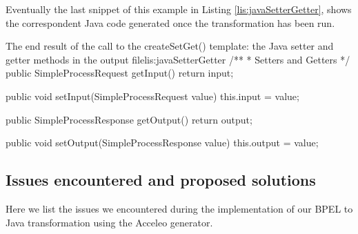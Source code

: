Eventually the last snippet of this example in Listing \ref{lis:javaSetterGetter}, shows the correspondent Java code generated once the transformation has been run.

\begin{center}
  \begin{minipage}{1\textwidth}
    \begin{java-code}{The end result of the call to the createSetGet() template: the Java setter and getter methods in the output file}{lis:javaSetterGetter}
    /**
     * Setters and Getters    
     */
public SimpleProcessRequest getInput() {
	return input;
}

public void setInput(SimpleProcessRequest value) { 
	this.input = value;
}

public SimpleProcessResponse getOutput() {
	return output;
}

public void setOutput(SimpleProcessResponse value) {
	this.output = value;
}	
    \end{java-code}
  \end{minipage}
\end{center}



\subsection{Issues encountered and proposed solutions}
\label{sec:issues}
Here we list the issues we encountered during the implementation of our BPEL to Java transformation using the Acceleo generator.
